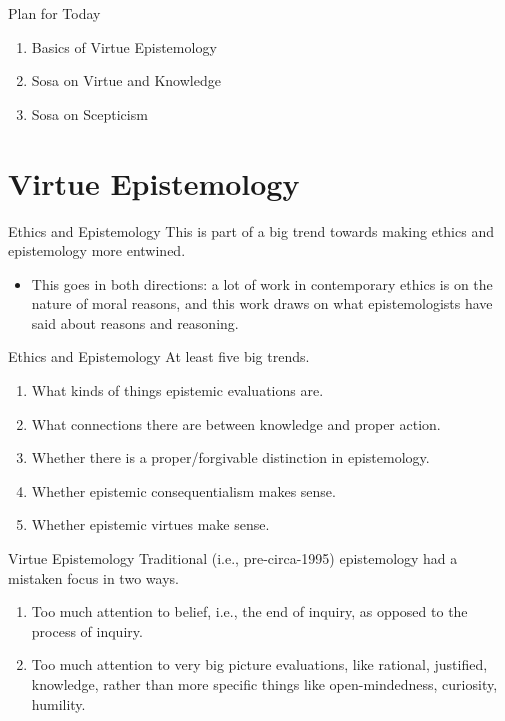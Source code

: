 \documentclass[
  17pt,
  letterpaper,
  ignorenonframetext,
  aspectratio=169,
  handout]{beamer}
\providecommand{\tightlist}{%
  \setlength{\itemsep}{0pt}\setlength{\parskip}{0pt}}\usepackage{longtable,booktabs,array}
\begin{document}
\begin{frame}{Plan for Today}
\protect\hypertarget{plan-for-today}{}
\begin{enumerate}[<+->]
\tightlist
\item
  Basics of Virtue Epistemology
\item
  Sosa on Virtue and Knowledge
\item
  Sosa on Scepticism
\end{enumerate}
\end{frame}

\hypertarget{virtue-epistemology}{%
\section{Virtue Epistemology}\label{virtue-epistemology}}

\begin{frame}{Ethics and Epistemology}
\protect\hypertarget{ethics-and-epistemology}{}
This is part of a big trend towards making ethics and epistemology more
entwined.

\begin{itemize}[<+->]
\tightlist
\item
  This goes in both directions: a lot of work in contemporary ethics is
  on the nature of moral reasons, and this work draws on what
  epistemologists have said about reasons and reasoning.
\end{itemize}
\end{frame}

\begin{frame}{Ethics and Epistemology}
\protect\hypertarget{ethics-and-epistemology-1}{}
At least five big trends.

\begin{enumerate}[<+->]
\tightlist
\item
  What kinds of things epistemic evaluations are.
\item
  What connections there are between knowledge and proper action.
\item
  Whether there is a proper/forgivable distinction in epistemology.
\item
  Whether epistemic consequentialism makes sense.
\item
  Whether epistemic virtues make sense.
\end{enumerate}
\end{frame}

\begin{frame}{Virtue Epistemology}
\protect\hypertarget{virtue-epistemology-1}{}
Traditional (i.e., pre-circa-1995) epistemology had a mistaken focus in
two ways.

\begin{enumerate}[<+->]
\tightlist
\item
  Too much attention to belief, i.e., the end of inquiry, as opposed to
  the process of inquiry.
\item
  Too much attention to very big picture evaluations, like rational,
  justified, knowledge, rather than more specific things like
  open-mindedness, curiosity, humility.
\end{enumerate}
\end{frame}
\end{document}
